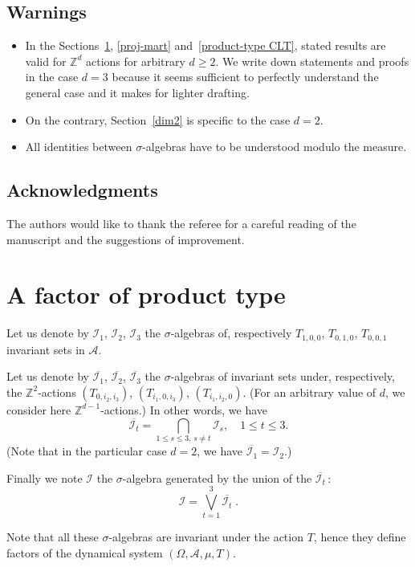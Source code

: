 \documentclass[10pt]{amsart}
\theoremstyle{definition}\newtheorem{defi}[theo]{Definition}\newtheorem{rema}[theo]{Remark}\newtheorem{exam}[theo]{Example}\newtheorem{exem}[theo]{Example}\newtheorem{nota}[theo]{Notation}
\newcommand{\Z}{\mathbb{Z}}
\newcommand*\I{\mathcal{I}}
\newcommand*\A{\mathcal{A}}
\begin{document}
\subsection*{Warnings}

\begin{itemize}
\item In the Sections~\ref{product-type factor}, \ref{proj-mart} and~\ref{product-type CLT}, stated results are valid for $\Z^d$ actions for arbitrary $d\geq 2$. We write down statements and proofs in the case $d=3$ because it seems sufficient to perfectly understand the general case and it makes for lighter drafting.
\item On the contrary, Section~\ref{dim2} is specific to the case $d=2$.
\item All identities between $\sigma$-algebras have to be understood modulo the measure.
\end{itemize}

\subsection*{Acknowledgments}
The authors would like to thank the referee for a careful reading of the manuscript and the suggestions of improvement.

\section{A factor of product type}\label{product-type factor}
{Let us denote by $\I_1$, $\I_2$, $\I_3$ the $\sigma$-algebras of, respectively $T_{1,0,0}$, $T_{0,1,0}$, $T_{0,0,1}$ invariant sets in $\A$.

Let us denote by $\overline{\I_1}$, $\overline{\I_2}$, $\overline{\I_3}$ the $\sigma$-algebras of invariant sets under, respectively, the $\Z^{2}$-actions $(T_{0,i_2,i_3})$, $(T_{i_1,0,i_3})$, $(T_{i_1,i_2,0})$. (For an arbitrary value of $d$, we consider here $\Z^{d-1}$-actions.) In other words, we have
\[
\overline{\I_t}=\bigcap_{1\leq s\leq 3,\,s\neq t}\I_s, \quad 1\leq t\leq 3.
\]
(Note that in the particular case $d=2$, we have $\overline{\I_1}=\I_2$.)

Finally we note $\I$ the $\sigma$-algebra generated by the union of the $\overline{\I_t}\,$:
\[
\I=\bigvee_{t=1}^3\overline{\I_t}\;.
\]
}

Note that all these $\sigma$-algebras are invariant under the action $T$, hence they define factors of the dynamical system $(\Omega,\A,\mu,T)$.
\end{document}
